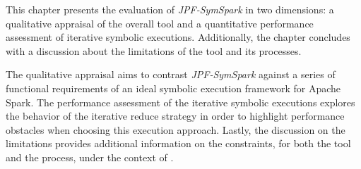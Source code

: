 
This chapter presents the evaluation of \textit{JPF-SymSpark} in two dimensions: a qualitative appraisal of the overall tool and a quantitative performance assessment of iterative symbolic executions. Additionally, the chapter concludes with a discussion about the limitations of the tool and its processes. 

The qualitative appraisal aims to contrast \textit{JPF-SymSpark} against a series of functional requirements of an ideal symbolic execution framework for Apache Spark. The performance assessment of the iterative symbolic executions explores the behavior of the iterative reduce strategy in order to highlight performance obstacles when choosing this execution approach. Lastly, the discussion on the limitations provides additional information on the constraints, for both the tool and the process, under the context of \jpf{}.




